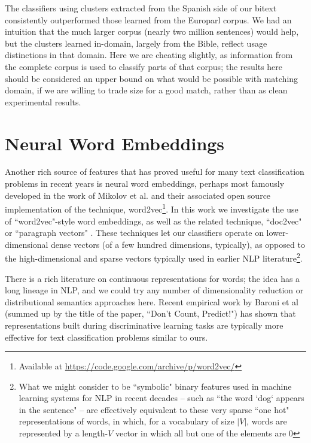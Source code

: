 The classifiers using clusters extracted from the Spanish side of our bitext
consistently outperformed those learned from the Europarl corpus. We had an
intuition that the much larger corpus (nearly two million sentences) would
help, but the clusters learned in-domain, largely from the Bible, reflect
usage distinctions in that domain. Here we are cheating slightly, as
information from the complete corpus is used to classify parts of that corpus;
the results here should be considered an upper bound on what would be possible
with matching domain, if we are willing to trade size for a good match, rather
than as clean experimental results.

\section{Neural Word Embeddings}
Another rich source of features that has proved useful for many text
classification problems in recent years is neural word embeddings, perhaps most
famously developed in the work of Mikolov et al. \cite{mikolovword2vec} and
their associated open source implementation of the technique,
word2vec\footnote{Available at
\url{https://code.google.com/archive/p/word2vec/}}. In this work we investigate
the use of ``word2vec"-style word embeddings, as well as the related technique,
``doc2vec" or ``paragraph vectors"
\cite{dai-document-embedding-2015,quocle-distributed-representations-2014}.
These techniques let our classifiers operate on lower-dimensional dense vectors
(of a few hundred dimensions, typically), as opposed to the high-dimensional
and sparse vectors typically used in earlier NLP literature\footnote{
What we might consider to be ``symbolic" binary features used in machine
learning systems for NLP in recent decades -- such as ``the word `dog` appears
in the sentence" -- are effectively equivalent to these very sparse ``one hot"
representations of words, in which, for a vocabulary of size $|V|$, words are
represented by a length-$V$ vector in which all but one of the elements are 0}.

There is a rich literature on continuous representations for words; the idea
has a long lineage in NLP, and we could try any number of dimensionality
reduction or distributional semantics approaches here. Recent empirical work by
Baroni et al \cite{baroni2014don} (summed up by the title of the paper, ``Don't
Count, Predict!") has shown that representations built during discriminative
learning tasks are typically more effective for text classification problems
similar to ours.

